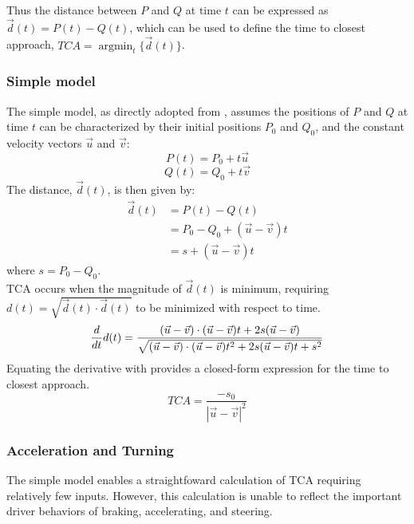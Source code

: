 \documentclass{article}
\begin{document}
Thus the distance between $P$ and $Q$ at time $t$ can be expressed as $\vec{d}(t) = P(t) - Q(t)$, which can be used to define the time to closest approach, $TCA = \operatorname*{argmin}_t \{ \vec{d}(t) \}$.

\subsubsection{Simple model}

The simple model, as directly adopted from \citet{Schwarz}, assumes the positions of $P$ and $Q$ at time $t$ can be characterized by their initial positions $P_0$ and $Q_0$, and the constant velocity vectors $\vec{u}$ and $\vec{v}$:
\begin{equation}
    P(t) = P_0 + t\vec{u}
    \label{eqp}
\end{equation}
\begin{equation}
 Q(t) = Q_0 + t\vec{v}   
 \label{eqq}
\end{equation}
The distance, $\vec{d}(t)$, is then given by:
\begin{equation}
    \begin{split}
       \vec{d}(t) &= P(t) - Q(t) \\
       &= P_0 - Q_0 + (\vec{u} - \vec{v})t \\
       &= s + (\vec{u} - \vec{v})t
       \label{eqd}
    \end{split}
\end{equation}
where $s = P_0 - Q_0$.\\
TCA occurs when the magnitude of $\vec{d}(t)$ is minimum, requiring $d(t) = \sqrt{\vec{d}(t)\cdot\vec{d}(t)}$ to be minimized with respect to time.
\begin{equation}
   \frac{d}{dt}d(t) = \frac{(\vec{u} - \vec{v})\cdot(\vec{u} - \vec{v})t+2s(\vec{u} - \vec{v})}{\sqrt{(\vec{u} - \vec{v})\cdot(\vec{u} - \vec{v})t^2+2s(\vec{u} - \vec{v})t + s^2}}
    \notag
\end{equation}
Equating the derivative with provides a closed-form expression for the time to closest approach.
\begin{equation}
 TCA = \displaystyle \frac{- s_0}{|\vec{u} - \vec{v}|^2}
\end{equation}

\subsubsection{Acceleration and Turning}

The simple model enables a straightfoward calculation of TCA requiring relatively few inputs. However, this calculation is unable to reflect the important driver behaviors of braking, accelerating, and steering.
\end{document}

